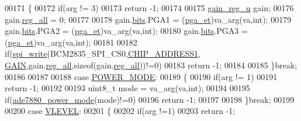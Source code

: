 \begin{DoxyCode}
00171                 \{          
00172                     \textcolor{keywordflow}{if}(arg != 3)
00173                         \textcolor{keywordflow}{return} -1;
00174                     
00175                     \hyperlink{a00025}{gain\_reg\_u} gain;
00176                     gain.\hyperlink{a00025_a74e4d0cc3da3b66723322f38bfb7f371}{reg\_all} = 0;
00177           
00178                     gain.\hyperlink{a00025_a8cca68b956b956a298c740d89ece0840}{bits}.PGA1 = (\hyperlink{a00036_ad9e71b7c5a4b7598dfea38b40734d96f}{pga\_et})va\_arg(va,\textcolor{keywordtype}{int});
00179                     gain.\hyperlink{a00025_a8cca68b956b956a298c740d89ece0840}{bits}.PGA2 = (\hyperlink{a00036_ad9e71b7c5a4b7598dfea38b40734d96f}{pga\_et})va\_arg(va,\textcolor{keywordtype}{int});
00180                     gain.\hyperlink{a00025_a8cca68b956b956a298c740d89ece0840}{bits}.PGA3 = (\hyperlink{a00036_ad9e71b7c5a4b7598dfea38b40734d96f}{pga\_et})va\_arg(va,\textcolor{keywordtype}{int});
00181                        
00182                     \textcolor{keywordflow}{if}(\hyperlink{a00007_ga2770219ad8ad1eda1817c0df934b47d0}{spi\_write}(BCM2835\_SPI\_CS0,\hyperlink{a00037_a94de2b046db6e10257ef4481c0a15eaa}{CHIP\_ADDRESS1},
      \hyperlink{a00036_a8c8f27b35dfa40ccf31c1ee31479a31c}{GAIN},gain.\hyperlink{a00025_a74e4d0cc3da3b66723322f38bfb7f371}{reg\_all},\textcolor{keyword}{sizeof}(gain.\hyperlink{a00025_a74e4d0cc3da3b66723322f38bfb7f371}{reg\_all}))!=0)
00183                     \textcolor{keywordflow}{return} -1;
00184                     
00185                 \}\textcolor{keywordflow}{break};
00186                 
00187                 
00188                 \textcolor{keywordflow}{case}  \hyperlink{a00043_a4e7bf0c205872c6db180b06792a62118}{POWER\_MODE}:
00189                 \{ 
00190                     \textcolor{keywordflow}{if}(arg != 1)
00191                       \textcolor{keywordflow}{return} -1;
00192                     
00193                     uint8\_t mode = va\_arg(va,\textcolor{keywordtype}{int});
00194                                         
00195                    \textcolor{keywordflow}{if}(\hyperlink{a00005_gae9a5abd4e5054e7ea3f149b1764f2cd0}{ade7880\_power\_mode}(mode)!=0)
00196                         \textcolor{keywordflow}{return} -1;  
00197                         
00198                 \}\textcolor{keywordflow}{break};
00199                 
00200                 \textcolor{keywordflow}{case} \hyperlink{a00036_a601225f0680bfe13cf5fc0c2c52f37c5}{VLEVEL}:
00201                 \{
00202                     \textcolor{keywordflow}{if}(arg !=1)
00203                       \textcolor{keywordflow}{return} -1;

\end{DoxyCode}
